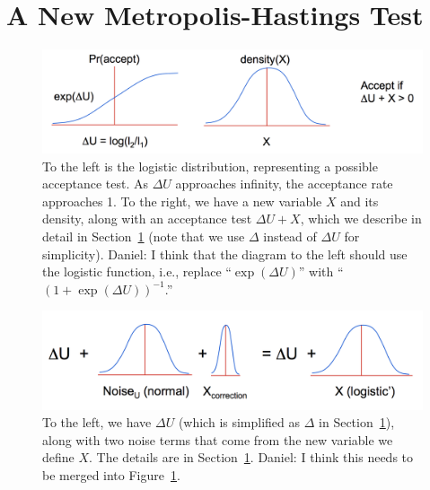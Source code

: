 \documentclass{article}
\begin{document}




\section{A New Metropolis-Hastings Test}\label{sec:our_algorithm}

\begin{figure}[t]
  \centering
  \includegraphics[width=\textwidth]{john_bair_fig01}
  \caption{
  To the left is the logistic distribution, representing a possible acceptance test. As $\Delta U$
  approaches infinity, the acceptance rate approaches 1. To the right, we have a new variable $X$
  and its density, along with an acceptance test $\Delta U + X$, which we describe in detail in
  Section~\ref{sec:our_algorithm} (note that we use $\Delta$ instead of $\Delta U$ for simplicity).
  {\color{blue}
  Daniel: I think that the diagram to the left should use the logistic function, i.e., replace
  ``$\exp(\Delta U)$'' with ``$(1+\exp(\Delta U))^{-1}$.''
  }
  }
  \label{fig:part1}
\end{figure}

\begin{figure}[t]
  \centering
  \includegraphics[width=\textwidth]{john_bair_fig02}
  \caption{
  To the left, we have $\Delta U$ (which is simplified as $\Delta$ in
  Section~\ref{sec:our_algorithm}), along with two noise terms that come from the new variable we
  define $X$. The details are in Section~\ref{sec:our_algorithm}.
  {\color{blue}
  Daniel: I think this needs to be merged into Figure~\ref{fig:part1}.
  }
  }
  \label{fig:part2}
\end{figure}
\end{document}
